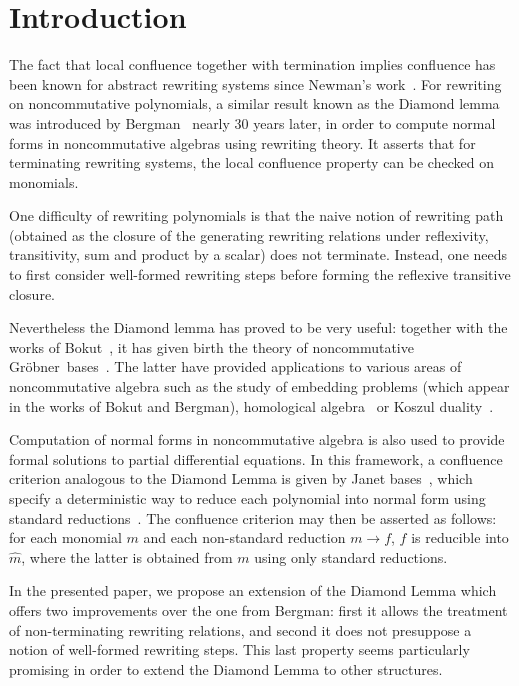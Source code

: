 \documentclass[10pt]{easychair}
\theoremstyle{definition}
\newcommand\G{Gröbner}
\begin{document}
\section{Introduction}

The fact that local confluence together with termination implies
confluence has been known for abstract rewriting systems since
Newman's work~\cite{MR0007372}. For rewriting on noncommutative
polynomials, a similar result known as the Diamond lemma was
introduced by Bergman~\cite{MR506890} nearly 30 years later, in order
to compute normal forms in noncommutative algebras using rewriting
theory. It asserts that for terminating rewriting systems, the local
confluence property can be checked on monomials.

One difficulty of rewriting polynomials is that the naive notion of
rewriting path (obtained as the closure of the generating rewriting
relations under reflexivity, transitivity, sum and product by a
scalar) does not terminate. Instead, one needs to first consider
well-formed rewriting steps before forming the reflexive transitive
closure.

Nevertheless the Diamond lemma has proved to be very useful: together
with the works of Bokut~\cite{MR0506423}, it has given birth the
theory of noncommutative \G\ bases~\cite{MR1299371}. The latter have
provided applications to various areas of noncommutative algebra such
as the study of embedding problems (which appear in the works of Bokut
and Bergman), homological algebra~\cite{MR1072284, MR2110434} or
Koszul duality~\cite{MR1832913, MR0265437}.

Computation of normal forms in noncommutative algebra is also used to
provide formal solutions to partial differential equations. In this
framework, a confluence criterion analogous to the Diamond Lemma is
given by Janet bases~\cite{MR2394773}, which specify a deterministic
way to reduce each polynomial into normal form using standard
reductions~\cite{Mell}. The confluence criterion may then be asserted
as follows: for each monomial $m$ and each non-standard reduction
$m\to f$, $f$ is reducible into $\widehat{m}$, where the latter is
obtained from $m$ using only standard reductions.

In the presented paper, we propose an extension of the Diamond Lemma
which offers two improvements over the one from Bergman: first it
allows the treatment of non-terminating rewriting relations, and
second it does not presuppose a notion of well-formed rewriting
steps. This last property seems particularly promising in order to
extend the Diamond Lemma to other structures.
\end{document}
